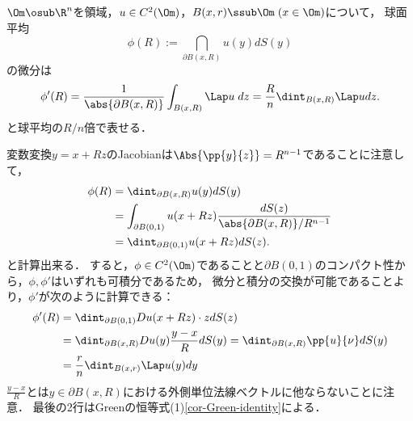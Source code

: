 \documentclass[uplatex,dvipdfmx]{jsreport}
\begin{document}
\begin{lemma}[球面平均の微分の表示]\label{lemma-derivative-of-surface-avarage-of-arbitrary-function}
    $\Om\osub\R^n$を領域，$u\in C^2(\Om)$，$B(x,r)\ssub\Om\;(x\in\Om)$について，
    球面平均
    \[\phi(R):=\dint_{\partial B(x,R)}u(y)dS(y)\]
    の微分は
    \[\phi'(R)=\frac{1}{\abs{\partial B(x,R)}}\int_{B(x,R)}\Lap u\;dz=\frac{R}{n}\dint_{B(x,R)}\Lap udz.\]
    と球平均の$R/n$倍で表せる．
\end{lemma}
\begin{Proof}
    変数変換$y=x+Rz$のJacobianは$\Abs{\pp{y}{z}}=R^{n-1}$であることに注意して，
    \begin{align*}
        \phi(R)&=\dint_{\partial B(x,R)}u(y)dS(y)\\
        &=\int_{\partial B(0,1)}u(x+Rz)\frac{dS(z)}{\abs{\partial B(x,R)}/R^{n-1}}\\
        &=\dint_{\partial B(0,1)}u(x+Rz)dS(z).
    \end{align*}
    と計算出来る．
    すると，$\phi\in C^2(\Om)$であることと$\partial B(0,1)$のコンパクト性から，$\phi,\phi'$はいずれも可積分であるため，
    微分と積分の交換が可能であることより，$\phi'$が次のように計算できる：
    \begin{align*}
        \phi'(R)&=\dint_{\partial B(0,1)}Du(x+Rz)\cdot zdS(z)\\
        &=\dint_{\partial B(x,R)}Du(y)\frac{y-x}{R}dS(y)=\dint_{\partial B(x,R)}\pp{u}{\nu}dS(y)\\
        &=\frac{r}{n}\dint_{B(x,r)}\Lap u(y)dy
    \end{align*}
    $\frac{y-x}{R}$とは$y\in\partial B(x,R)$における外側単位法線ベクトルに他ならないことに注意．
    最後の2行はGreenの恒等式(1)\ref{cor-Green-identity}による．
\end{Proof}
\end{document}

